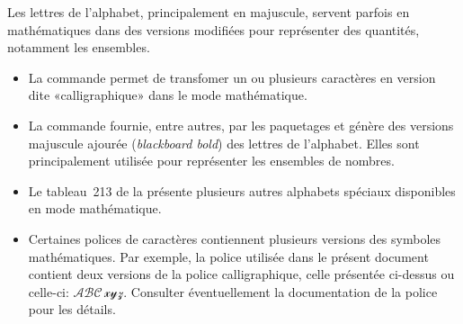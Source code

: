 Les lettres de l'alphabet, principalement en majuscule, servent
parfois en mathématiques dans des versions modifiées pour représenter
des quantités, notamment les ensembles.

\begin{itemize}
\item La commande \cmd{\mathcal} permet de transfomer un ou plusieurs
  caractères en version dite «calligraphique» dans le mode mathématique.
\item La commande \cmd{\mathbb} fournie, entre autres, par les
  paquetages  et  génère des versions
  majuscule ajourée (\emph{blackboard bold}) des lettres de
  l'alphabet. Elles sont principalement utilisée pour représenter les
  ensembles de nombres.
\item Le tableau~213 de la %
  présente plusieurs autres alphabets spéciaux disponibles en
  mode mathématique.
\item Certaines polices de caractères contiennent plusieurs versions
  des symboles mathématiques. Par exemple, la police utilisée dans le
  présent document contient deux versions de la police calligraphique,
  celle présentée ci-dessus ou celle-ci: %
  $\mathscr{ABC\, xyz}$.
  Consulter éventuellement la documentation de la police pour les détails.
\end{itemize}

